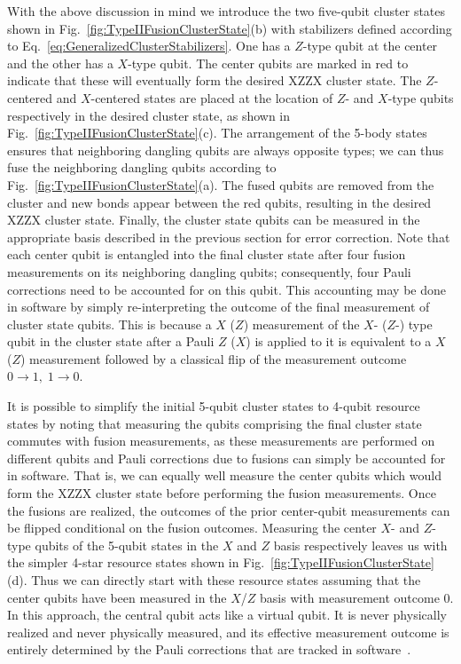 \documentclass[reprint,
groupedaddress,
 prl,amsmath,amssymb,
 aps]{revtex4-2}
\theoremstyle{definition}
\begin{document}
\begin{bibunit}
With the above discussion in mind we introduce the two five-qubit cluster states shown in Fig.~\ref{fig:TypeIIFusionClusterState}(b) with stabilizers defined according to Eq.~\eqref{eq:GeneralizedClusterStabilizers}. One has a $Z$-type qubit at the center and the other has a $X$-type qubit. The center qubits are marked in red to indicate that these will eventually form the desired XZZX cluster state. The $Z$-centered and $X$-centered states are placed at the location of $Z$- and $X$-type qubits respectively in the desired cluster state, as shown in Fig.~\ref{fig:TypeIIFusionClusterState}(c). The arrangement of the 5-body states ensures that neighboring dangling qubits are always opposite types; we can thus fuse the neighboring dangling qubits according to Fig.~\ref{fig:TypeIIFusionClusterState}(a). The fused qubits are removed from the cluster and new bonds appear between the red qubits, resulting in the desired XZZX cluster state. Finally, the cluster state qubits can be measured in the appropriate basis described in the previous section for error correction. Note that each center qubit is entangled into the final cluster state after four fusion measurements on its neighboring dangling qubits; consequently, four Pauli corrections need to be accounted for on this qubit. This accounting may be done in software by simply re-interpreting the outcome of the final measurement of cluster state qubits. This is because a $X$ ($Z$) measurement of the $X$- ($Z$-) type qubit in the cluster state after a Pauli $Z$ ($X$) is applied to it is equivalent to a $X$ ($Z$) measurement followed by a classical flip of the measurement outcome {{$0\rightarrow 1,\; 1\rightarrow 0$}}.



It is possible to simplify the initial 5-qubit cluster states to 4-qubit resource states by noting that measuring the qubits comprising the final cluster state commutes with fusion measurements, as these measurements are performed on different qubits and Pauli corrections due to fusions can simply be accounted for in software. That is, we can equally well measure the center qubits which would form the XZZX cluster state before performing the fusion measurements. Once the fusions are realized, the outcomes of the prior center-qubit measurements can be flipped conditional on the fusion outcomes. Measuring the center $X$- and $Z$-type qubits of the 5-qubit states in the $X$ and $Z$ basis respectively leaves us with the simpler 4-star resource states shown in Fig.~\ref{fig:TypeIIFusionClusterState}(d). Thus we can directly start with these resource states assuming that the center qubits have been measured in the $X$/$Z$ basis with measurement outcome {{$0$}}. In this approach, the central qubit acts like a virtual qubit. It is never physically realized and never physically measured, and its effective measurement outcome is entirely determined by the Pauli corrections that are tracked in software~\cite{bartolucci2021fusion}.




\end{bibunit}
\end{document}

